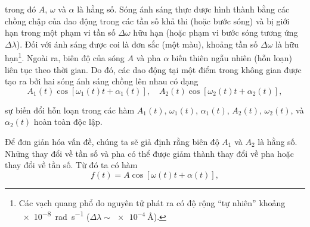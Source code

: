 \noindent
trong đó $A$, $\omega$ và $\alpha$ là hằng số.
Sóng ánh sáng thực được hình thành bằng các chồng chập của dao động trong các tần số khả thi (hoặc bước sóng) và bị giới hạn trong một phạm vi tần số $\Delta{\omega}$ hữu hạn (hoặc phạm vi bước sóng tương ứng $\Delta{\lambda}$).
Đối với ánh sáng được coi là đơn sắc (một màu), khoảng tần số $\Delta{\omega}$ là hữu hạn\footnote{Các vạch quang phổ do nguyên tử phát ra có độ rộng ``tự nhiên'' khoảng \SI{e-8}{\radian\per\second} ($\Delta{\lambda}\sim\SI{e-4}{\angstrom}$).}.
Ngoài ra, biên độ của sóng $A$ và pha $\alpha$ biến thiên ngẫu nhiên (hỗn loạn) liên tục theo thời gian.
Do đó, các dao động tại một điểm trong không gian được tạo ra bởi hai sóng ánh sáng chồng lên nhau có dạng
\begin{equation}\label{eq:17_13}
    A_1(t) \cos[\omega_1(t) t + \alpha_1(t)],\quad A_2(t) \cos[\omega_2(t) t + \alpha_2(t)],
\end{equation}

\noindent
sự biến đổi hỗn loạn trong các hàm $A_1(t)$, $\omega_1(t)$, $\alpha_1(t)$, $A_2(t)$, $\omega_2(t)$, và $\alpha_2(t)$ hoàn toàn độc lập.

Để đơn giản hóa vấn đề, chúng ta sẽ giả định rằng biên độ $A_1$ và $A_2$ là hằng số.
Những thay đổi về tần số và pha có thể được giảm thành thay đổi về pha hoặc thay đổi về tần số.
Từ đó ta có hàm
\begin{equation}\label{eq:17_14}
    f(t) = A \cos[\omega(t) t + \alpha(t)],
\end{equation}

